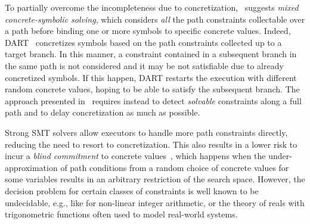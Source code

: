 

To partially overcome the incompleteness due to concretization,~\cite{PRV-ISSTA11} suggests {\em mixed concrete-symbolic solving}, which considers {\em all} the path constraints collectable over a path before binding one or more symbols to specific concrete values. Indeed, {\sc DART}~\cite{DART-PLDI05} concretizes symbols based on the path constraints collected up to a target branch. In this manner, a constraint contained in a subsequent branch in the same path is not considered and it may be not satisfiable due to already concretized symbols. If this happen, {\sc DART} restarts the execution with different random concrete values, hoping to be able to satisfy the subsequent branch. The approach presented in~\cite{PRV-ISSTA11} requires instead to detect {\em solvable} constraints along a full path and to delay concretization as much as possible.

Strong SMT solvers allow executors to handle more path constraints directly, reducing the need to resort to concretization. This also results in a lower risk to incur a {\em blind commitment} to concrete values~\cite{DA-FSE14}, which happens when the under-approximation of path conditions from a random choice of concrete values for some variables results in an arbitrary restriction of the search space.
However, the decision problem for certain classes of constraints is well known to be undecidable, e.g., like for non-linear integer arithmetic, or the theory of reals with trigonometric functions often used to model real-world systems.

